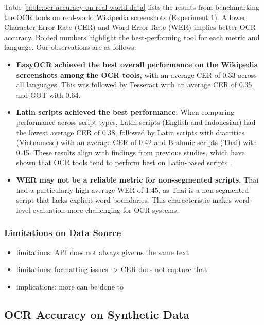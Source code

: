 \documentclass[12pt,oneside]{memoir}
\begin{document}
Table \ref{table:ocr-accuracy-on-real-world-data} lists the results from benchmarking the OCR tools on real-world Wikipedia screenshots (Experiment 1).
A lower Character Error Rate (CER) and Word Error Rate (WER) implies better OCR accuracy.
Bolded numbers highlight the best-performing tool for each metric and language. Our observations are as follows:

\begin{itemize}
    \item \textbf{EasyOCR achieved the best overall performance on the Wikipedia screenshots among the OCR tools,} with an average CER of 0.33 across all languages. This was followed by Tesseract with an average CER of 0.35, and GOT with 0.64. 
    \item \textbf{Latin scripts achieved the best performance.} When comparing performance across script types, Latin scripts (English and Indonesian) had the lowest average CER of 0.38, followed by Latin scripts with diacritics (Vietnamese) with an average CER of 0.42 and Brahmic scripts (Thai) with 0.45. These results align with findings from previous studies, which have shown that OCR tools tend to perform best on Latin-based scripts \parencite{hegghammer-2022,ignat-etal-2022}.
    \item \textbf{WER may not be a reliable metric for non-segmented scripts.} Thai had a particularly high average WER of 1.45, as Thai is a non-segmented script that lacks explicit word boundaries. This characteristic makes word-level evaluation more challenging for OCR systems.
\end{itemize}

\subsubsection{Limitations on Data Source}

\begin{itemize}
    \item limitations: API does not always give us the same text
    \item limitations: formatting issues -> CER does not capture that
    \item implications: more can be done to 
\end{itemize}

\subsection{OCR Accuracy on Synthetic Data} \label{section:ocr-accuracy-on-synthetic-data}
\end{document}

